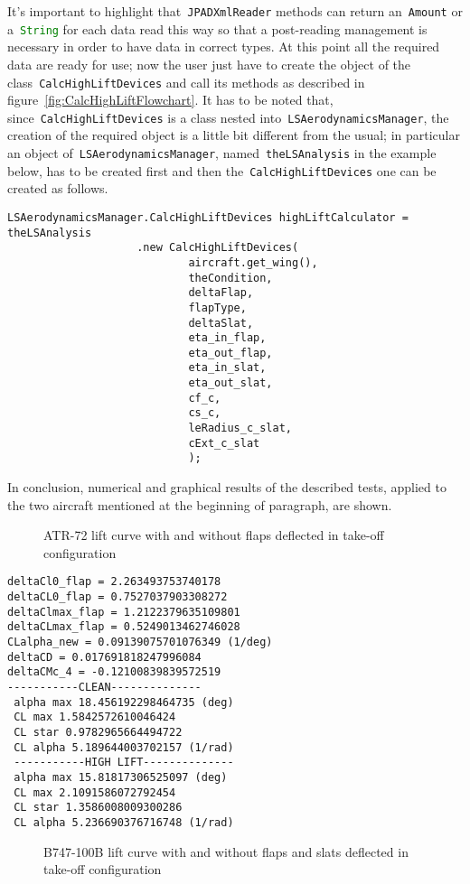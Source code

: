 \bigskip
\noindent
It's important to highlight that~\lstinline[language=Java]!JPADXmlReader! methods can return an~\lstinline[language=Java]!Amount!\cite{jscienceAmount} or a~\lstinline[language=Java]!String! for each data read this way so that a post-reading management is necessary in order to have data in correct types. At this point all the required data are ready for use; now the user just have to create the object of the class~\lstinline[language=Java]!CalcHighLiftDevices! and call its methods as described in figure~\ref{fig:CalcHighLiftFlowchart}.
%
It has to be noted that, since~\lstinline[language=Java]!CalcHighLiftDevices! is a class nested into~\lstinline[language=Java]!LSAerodynamicsManager!, the creation of the required object is a little bit different from the usual; in particular an object of~\lstinline[language=Java]!LSAerodynamicsManager!, named~\lstinline[language=Java]!theLSAnalysis! in the example below, has to be created first and then the~\lstinline[language=Java]!CalcHighLiftDevices! one can be created as follows.

\bigskip
\lstset{language=Java}
\begin{lstlisting}[caption={Excerpt of B747-100B test - calculator object creation}, captionpos=b, tabsize=2]
	LSAerodynamicsManager.CalcHighLiftDevices highLiftCalculator = theLSAnalysis
					.new CalcHighLiftDevices(
							aircraft.get_wing(),
							theCondition,
							deltaFlap,
							flapType,
							deltaSlat,
							eta_in_flap,
							eta_out_flap,
							eta_in_slat,
							eta_out_slat,
							cf_c,
							cs_c,
							leRadius_c_slat,
							cExt_c_slat
							);
\end{lstlisting}

\bigskip
\noindent
In conclusion, numerical and graphical results of the described tests, applied to the two aircraft mentioned at the beginning of paragraph, are shown.
%
\begin{figure}[H]
\centering

\caption{ATR-72 lift curve with and without flaps deflected in take-off configuration}
\label{fig:FlapATR}
\end{figure}

\bigskip
\lstset{language=Java}
\begin{lstlisting}[caption={ATR-72 test results}, captionpos=b, tabsize=2]
deltaCl0_flap = 2.263493753740178
deltaCL0_flap = 0.7527037903308272
deltaClmax_flap = 1.2122379635109801
deltaCLmax_flap = 0.5249013462746028
CLalpha_new = 0.09139075701076349 (1/deg)
deltaCD = 0.017691818247996084
deltaCMc_4 = -0.12100839839572519
-----------CLEAN-------------- 
 alpha max 18.456192298464735 (deg)
 CL max 1.5842572610046424
 CL star 0.9782965664494722
 CL alpha 5.189644003702157 (1/rad)
 -----------HIGH LIFT-------------- 
 alpha max 15.81817306525097 (deg)
 CL max 2.1091586072792454
 CL star 1.3586008009300286
 CL alpha 5.236690376716748 (1/rad)
\end{lstlisting}
%
\begin{figure}[H]
\centering

\caption{B747-100B lift curve with and without flaps and slats deflected in take-off configuration}
\label{fig:FlapATR}
\end{figure}

